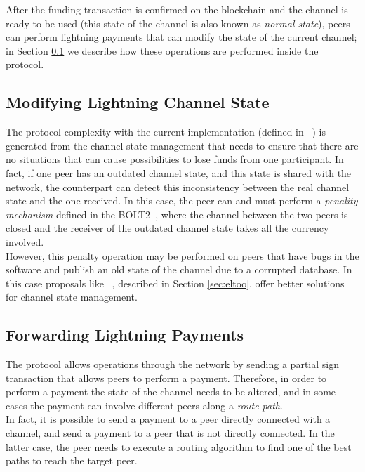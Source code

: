 After the funding transaction is confirmed on the blockchain and the channel is ready to be used (this state of the channel is also known as \emph{normal state}),
peers can perform lightning payments that can modify the state of the current channel; in Section \ref{sec:modify_channel_state} we describe how these operations are performed inside the protocol.

\subsection{Modifying Lightning Channel State}\label{sec:modify_channel_state}

The {\LN} protocol complexity with the current implementation (defined in ~\cite{lightning-bolts})
is generated from the channel state management that needs to ensure that there are no situations that can
cause  possibilities to lose funds from one participant.
In fact, if one peer has an outdated channel state, and this state is shared with the network, the counterpart can
detect this inconsistency between the real channel state and the one received. In this case, the peer can and must
perform  a \emph{penality mechanism} defined in the BOLT2~\cite{bolt2}, where the channel between the two peers
is closed and the receiver of the outdated channel state takes all the currency involved.\\
However, this penalty operation may be performed on peers that have bugs in the software and publish an old state of the
channel due to a corrupted database. In this case proposals like ~\cite{eltoo}, described in Section \ref{sec:eltoo}, offer
better solutions for channel state management.

\subsection{Forwarding Lightning Payments}
\label{sec:lightning_forwarding}

The {\LN} protocol allows operations through the network by sending a partial sign transaction that
allows peers to perform a payment.
Therefore, in order to perform a payment the state of the channel needs to be altered, and in some cases the payment can involve
different peers along a \emph{route path}.\\
In fact, it is possible to send a payment to a peer directly connected with a channel, and send a payment to a peer
that is not directly connected. In the latter case, the peer needs to execute a routing algorithm
to find one of the best paths to reach the target peer.

